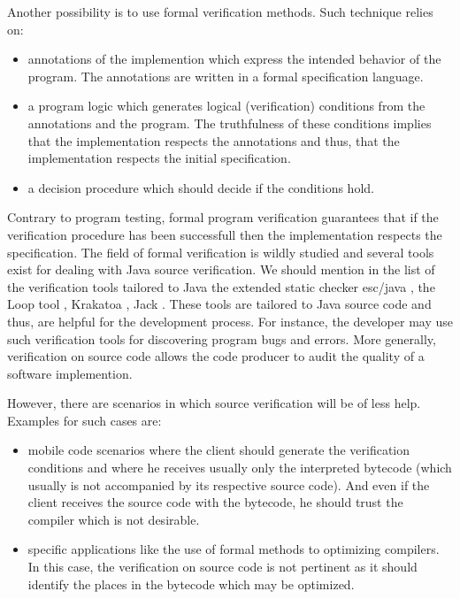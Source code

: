  Another possibility is to use formal verification methods. Such technique relies on:
\begin{itemize} 
   \item annotations of the implemention which express the intended behavior of the program. The annotations
         are written in a formal specification language.
   \item a program logic which  generates logical (verification) conditions  from the annotations and the program. 
         The truthfulness of these conditions implies that the implementation respects the annotations and thus,
	 that the implementation respects the initial specification. 
    
   \item a decision procedure which should decide if the conditions hold.     
           
\end{itemize}
Contrary to program testing,  formal program verification guarantees that if the verification procedure 
has been successfull then the implementation respects the specification. 
 The field of formal  verification is wildly studied and several  tools exist for
dealing with Java source verification. We should mention in the list of the verification tools tailored to Java the extended static checker
esc/java \cite{escjava}, the Loop tool \cite{jacobs03java},
Krakatoa \cite{marche03krakatoa}, Jack \cite{BRL-JACK}. These tools are tailored to Java source code and thus,
 are helpful for the development process. For instance, the developer may use such verification tools for discovering program bugs and
 errors. More generally, verification on source code allows the code producer to audit the quality of a software implemention.
 
However, there are scenarios in which source verification will be of less help. Examples for such cases are:
\begin{itemize}
    \item  mobile code scenarios where 
           the client should generate the verification conditions and where he receives usually only
           the interpreted bytecode (which usually is not accompanied by its respective source code). And even if the client receives the source code
	   with the bytecode, he should trust the compiler which is not desirable.
    \item  specific applications like the use of formal methods to optimizing compilers. In this case, the verification on source code
           is not pertinent as it should identify the places in the bytecode which may be optimized.
\end{itemize} 


